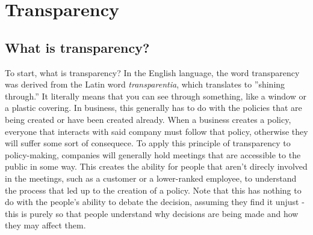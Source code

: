\section{Transparency}
\subsection{What is transparency?}
To start, what is transparency? In the English language, the word transparency was 
derived from the Latin word \textit{transparentia}, which translates to ''shining through.''
It literally means that you can see through something, like a window or a plastic covering.
In business, this generally has to do with the policies that are being created or have been
created already. When a business creates a policy, everyone that interacts with said company
must follow that policy, otherwise they will suffer some sort of consequece. To apply this
principle of transparency to policy-making, companies will generally hold meetings that are
accessible to the public in some way. This creates the ability for people that aren't direcly
involved in the meetings, such as a customer or a lower-ranked employee, to understand the
process that led up to the creation of a policy. Note that this has nothing to do with the
people's ability to debate the decision, assuming they find it unjust - this is purely so 
that people understand why decisions are being made and how they may affect them.

